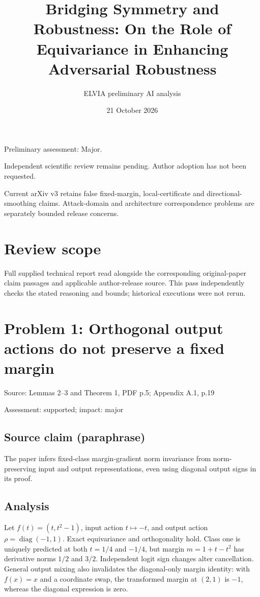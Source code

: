 \documentclass[11pt]{article}
\begin{document}
\title{Bridging Symmetry and Robustness: On the Role of Equivariance in Enhancing Adversarial Robustness}

\author{ELVIA preliminary AI analysis}\date{21 October 2026}\maketitle

Preliminary assessment: Major.\par

Independent scientific review remains pending. Author adoption has not been requested.

Current arXiv v3 retains false fixed-margin, local-certificate and directional-smoothing claims. Attack-domain and architecture correspondence problems are separately bounded release concerns.

\section*{Review scope}

Full supplied technical report read alongside the corresponding original-paper claim passages and applicable author-release source. This pass independently checks the stated reasoning and bounds; historical executions were not rerun.

\section*{Problem 1: Orthogonal output actions do not preserve a fixed margin}

Source: Lemmas 2–3 and Theorem 1, PDF p.5; Appendix A.1, p.19

Assessment: supported; impact: major

\subsection*{Source claim (paraphrase)}

The paper infers fixed-class margin-gradient norm invariance from norm-preserving input and output representations, even using diagonal output signs in its proof.

\subsection*{Analysis}

Let \(f(t)=(t,t^2-1)\), input action \(t\mapsto-t\), and output action \(\rho=\operatorname{diag}(-1,1)\). Exact equivariance and orthogonality hold. Class one is uniquely predicted at both \(t=1/4\) and \(-1/4\), but margin \(m=1+t-t^2\) has derivative norms \(1/2\) and \(3/2\). Independent logit sign changes alter cancellation. General output mixing also invalidates the diagonal-only margin identity: with \(f(x)=x\) and a coordinate swap, the transformed margin at \((2,1)\) is \(-1\), whereas the diagonal expression is zero.
\end{document}
